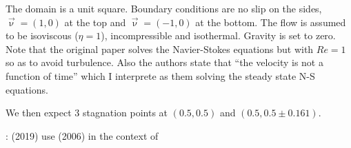 The domain is a unit square. Boundary conditions are no slip on the sides, 
$\vec\upnu=(1,0)$ at the top and $\vec\upnu=(-1,0)$ at the bottom.
The flow is assumed to be isoviscous ($\eta=1$), incompressible and isothermal. 
Gravity is set to zero.
Note that the original paper \cite{cakm06} solves the Navier-Stokes equations but with $Re=1$
so as to avoid turbulence.
Also the authors state that ``the velocity is not a function of time'' which I interprete as 
them solving the steady state N-S equations. 

We then expect 3 stagnation points at $(0.5,0.5)$ and $(0.5,0.5\pm 0.161)$.


\Literature: \textcite{widd19} (2019) use \textcite{cakm06} (2006) in the context of 
